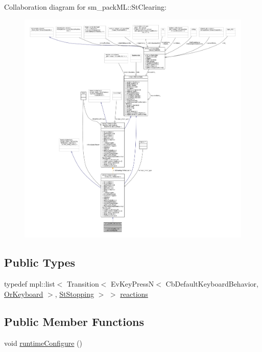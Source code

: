 Collaboration diagram for sm\+\_\+pack\+ML\+:\+:St\+Clearing\+:
\nopagebreak
\begin{figure}[H]
\begin{center}
\leavevmode
\includegraphics[width=350pt]{structsm__packML_1_1StClearing__coll__graph}
\end{center}
\end{figure}
\subsection*{Public Types}
\begin{DoxyCompactItemize}
\item 
typedef mpl\+::list$<$ Transition$<$ Ev\+Key\+PressN$<$ Cb\+Default\+Keyboard\+Behavior, \hyperlink{classsm__packML_1_1OrKeyboard}{Or\+Keyboard} $>$, \hyperlink{structsm__packML_1_1StStopping}{St\+Stopping} $>$ $>$ \hyperlink{structsm__packML_1_1StClearing_a1c516812d5940546adb93b06b446a2be}{reactions}
\end{DoxyCompactItemize}
\subsection*{Public Member Functions}
\begin{DoxyCompactItemize}
\item 
void \hyperlink{structsm__packML_1_1StClearing_a5482b52bf9c97a5ef422403c27f92f49}{runtime\+Configure} ()
\end{DoxyCompactItemize}

